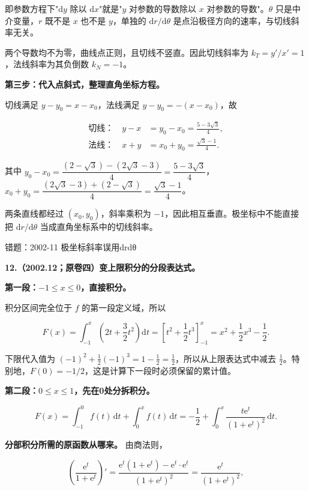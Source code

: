 \documentclass[UTF8,11pt,fontset=windows]{ctexart}
\begin{document}
即参数方程下"$\mathrm dy$ 除以 $\mathrm dx$"就是"$y$ 对参数的导数除以 $x$ 对参数的导数"。$\theta$ 只是中介变量，$r$ 既不是 $x$ 也不是 $y$，单独的 $\mathrm dr/\mathrm d\theta$ 是点沿极径方向的速率，与切线斜率无关。

两个导数均不为零，曲线点正则，且切线不竖直。因此切线斜率为 $k_T=y'/x'=1$，法线斜率为其负倒数 $k_N=-1$。

\textbf{第三步：代入点斜式，整理直角坐标方程。}

切线满足 $y-y_0=x-x_0$，法线满足 $y-y_0=-(x-x_0)$，故

$$
\begin{aligned}
\text{切线：}\quad y-x&=y_0-x_0=\boxed{\frac{5-3\sqrt3}{4}},\\
\text{法线：}\quad x+y&=x_0+y_0=\boxed{\frac{\sqrt3-1}{4}}.
\end{aligned}
$$

其中 $y_0-x_0=\dfrac{(2-\sqrt3)-(2\sqrt3-3)}4=\dfrac{5-3\sqrt3}4$，$x_0+y_0=\dfrac{(2\sqrt3-3)+(2-\sqrt3)}4=\dfrac{\sqrt3-1}4$。

两条直线都经过 $(x_0,y_0)$，斜率乘积为 $-1$，因此相互垂直。极坐标中不能直接把 $\mathrm dr/\mathrm d\theta$ 当成直角坐标系中的切线斜率。

\begingroup\color{gray}错题：2002-11 极坐标斜率误用drdθ\par\endgroup

\clearpage

\textbf{12.（2002.12；原卷四）变上限积分的分段表达式。}

\textbf{第一段：$-1\le x\le0$，直接积分。}

积分区间完全位于 $f$ 的第一段定义域，所以

$$
F(x)=\int_{-1}^x\left(2t+\frac32t^2\right)\mathrm dt
=\left[t^2+\frac12t^3\right]_{-1}^x
=x^2+\frac12x^3-\frac12.
$$

下限代入值为 $(-1)^2+\frac12(-1)^3=1-\frac12=\frac12$，所以从上限表达式中减去 $\frac12$。特别地，$F(0)=-1/2$，这是计算下一段时必须保留的累计值。

\textbf{第二段：$0\le x\le1$，先在0处分拆积分。}

$$
F(x)=\int_{-1}^{0}f(t)\,\mathrm dt+\int_0^x f(t)\,\mathrm dt
=-\frac12+\int_0^x\frac{t\mathrm e^t}{(1+\mathrm e^t)^2}\,\mathrm dt.
$$

\textbf{分部积分所需的原函数从哪来。} 由商法则，

$$
\left(\frac{\mathrm e^t}{1+\mathrm e^t}\right)'
=\frac{\mathrm e^t(1+\mathrm e^t)-\mathrm e^t\cdot\mathrm e^t}{(1+\mathrm e^t)^2}
=\frac{\mathrm e^t}{(1+\mathrm e^t)^2},
$$
\end{document}
